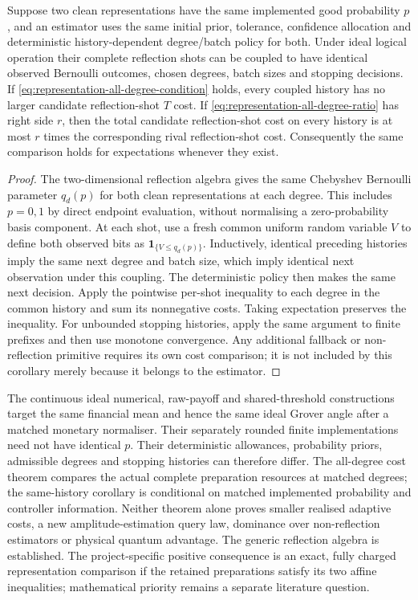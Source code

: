 \begin{corollary}
\label{cor:representation-same-history}
Suppose two clean representations have the same implemented good
probability $p$, and an estimator uses the same initial prior, tolerance,
confidence allocation and deterministic history-dependent degree/batch
policy for both. Under ideal logical operation their complete reflection
shots can be coupled to have identical observed Bernoulli outcomes,
chosen degrees, batch sizes and stopping decisions. If
\eqref{eq:representation-all-degree-condition} holds, every coupled
history has no larger candidate reflection-shot $T$ cost. If
\eqref{eq:representation-all-degree-ratio} has right side $r$, then
the total candidate reflection-shot cost on every history is at most
$r$ times the corresponding rival reflection-shot cost. Consequently
the same comparison holds for expectations whenever they exist.
\end{corollary}
\begin{proof}
The two-dimensional reflection algebra gives the same
Chebyshev Bernoulli parameter $q_d(p)$ for both clean representations
at each degree. This includes $p=0,1$ by direct endpoint evaluation,
without normalising a zero-probability basis component. At each shot,
use a fresh common uniform random variable $V$ to define both observed
bits as $\mathbf1_{\{V\leq q_d(p)\}}$. Inductively, identical preceding
histories imply the same next degree and batch size, which imply
identical next observation under this coupling. The deterministic
policy then makes the same next decision. Apply the pointwise
per-shot inequality to each degree in the common history and sum its
nonnegative costs. Taking expectation preserves the inequality.
For unbounded stopping histories, apply the same argument to finite
prefixes and then use monotone convergence. Any additional fallback
or non-reflection primitive requires its own cost comparison; it is not
included by this corollary merely because it belongs to the estimator.
\end{proof}

The continuous ideal numerical, raw-payoff and shared-threshold
constructions target the same financial mean and hence the same ideal
Grover angle after a matched monetary normaliser. Their separately
rounded finite implementations need not have identical $p$. Their
deterministic allowances, probability priors, admissible degrees and
stopping histories can therefore differ. The all-degree cost theorem
compares the actual complete preparation resources at matched degrees;
the same-history corollary is conditional on matched implemented
probability and controller information. Neither theorem alone proves
smaller realised adaptive costs, a new amplitude-estimation query law,
dominance over non-reflection estimators or physical quantum advantage.
The generic reflection algebra is established. The project-specific
positive consequence is an exact, fully charged representation
comparison if the retained preparations satisfy its two affine
inequalities; mathematical priority remains a separate literature
question.
